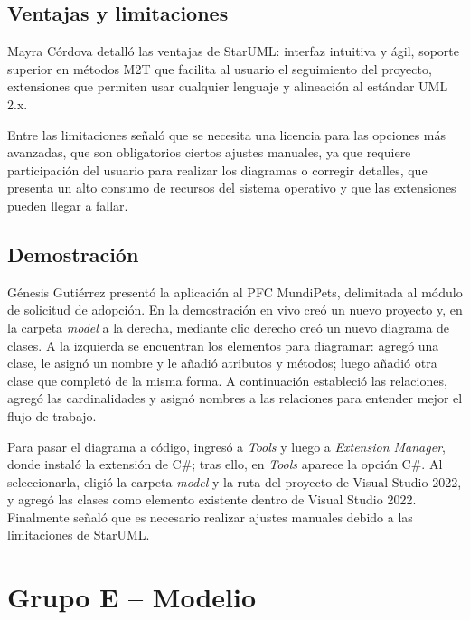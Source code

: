 \documentclass[journal,onecolumn]{IEEEtran}
\begin{document}
	\subsection{Ventajas y limitaciones}
	
	Mayra Córdova detalló las ventajas de StarUML: interfaz intuitiva y ágil, soporte superior en métodos M2T que facilita al usuario el seguimiento del proyecto, extensiones que permiten usar cualquier lenguaje y alineación al estándar UML 2.x.
	
	Entre las limitaciones señaló que se necesita una licencia para las opciones más avanzadas, que son obligatorios ciertos ajustes manuales, ya que requiere participación del usuario para realizar los diagramas o corregir detalles, que presenta un alto consumo de recursos del sistema operativo y que las extensiones pueden llegar a fallar.
	
	\subsection{Demostración}
	
	Génesis Gutiérrez presentó la aplicación al PFC MundiPets, delimitada al módulo de solicitud de adopción. En la demostración en vivo creó un nuevo proyecto y, en la carpeta \textit{model} a la derecha, mediante clic derecho creó un nuevo diagrama de clases. A la izquierda se encuentran los elementos para diagramar: agregó una clase, le asignó un nombre y le añadió atributos y métodos; luego añadió otra clase que completó de la misma forma. A continuación estableció las relaciones, agregó las cardinalidades y asignó nombres a las relaciones para entender mejor el flujo de trabajo.
	
	Para pasar el diagrama a código, ingresó a \textit{Tools} y luego a \textit{Extension Manager}, donde instaló la extensión de C\#; tras ello, en \textit{Tools} aparece la opción C\#. Al seleccionarla, eligió la carpeta \textit{model} y la ruta del proyecto de Visual Studio 2022, y agregó las clases como elemento existente dentro de Visual Studio 2022. Finalmente señaló que es necesario realizar ajustes manuales debido a las limitaciones de StarUML.
	
	\section{Grupo E -- Modelio}
	
\end{document}
